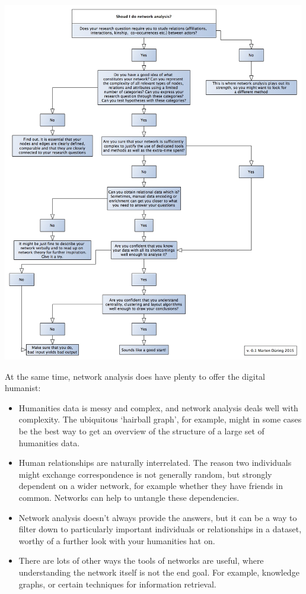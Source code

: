 \documentclass[
]{book}
\begin{document}
\includegraphics[width=5.20833in,height=\textheight]{images/shouldyoudonetworkanalysis_xxl.jpg}

At the same time, network analysis does have plenty to offer the digital humanist:

\begin{itemize}
\item
  Humanities data is messy and complex, and network analysis deals well with complexity. The ubiquitous `hairball graph', for example, might in some cases be the best way to get an overview of the structure of a large set of humanities data.
\item
  Human relationships are naturally interrelated. The reason two individuals might exchange correspondence is not generally random, but strongly dependent on a wider network, for example whether they have friends in common. Networks can help to untangle these dependencies.
\item
  Network analysis doesn't always provide the answers, but it can be a way to filter down to particularly important individuals or relationships in a dataset, worthy of a further look with your humanities hat on.
\item
  There are lots of other ways the tools of networks are useful, where understanding the network itself is not the end goal. For example, knowledge graphs, or certain techniques for information retrieval.
\end{itemize}
\end{document}
